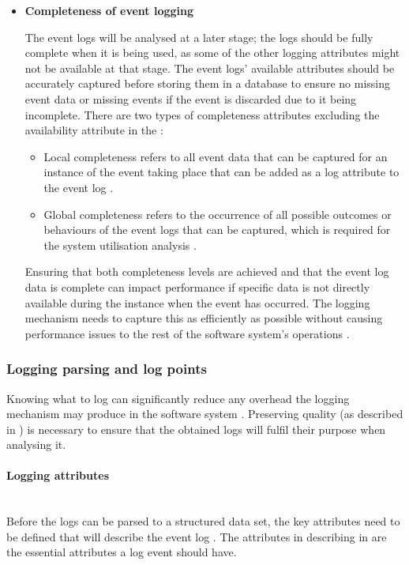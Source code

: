 \begin{itemize}
	\item \textbf{Completeness of event logging}\par The event logs will be analysed at a later stage; the logs should be fully complete when it is being used, as some of the other logging attributes might not be available at that stage. The event logs' available attributes should be accurately captured before storing them in a database to ensure no missing event data or missing events if the event is discarded due to it being incomplete. There are two types of completeness attributes excluding the availability attribute in the :

	\begin{itemize}
		\item Local completeness refers to all event data that can be captured for an instance of the event taking place that can be added as a log attribute to the event log \cite{Kherbouche2017, VanDerAalst2004}.
		\item Global completeness refers to the occurrence of all possible outcomes or behaviours of the event logs that can be captured, which is required for the system utilisation analysis \cite{Kherbouche2017, VanDerAalst2004}.
	\end{itemize}

	Ensuring that both completeness levels are achieved and that the event log data is complete can impact performance if specific data is not directly available during the instance when the event has occurred. The logging mechanism needs to capture this as efficiently as possible without causing performance issues to the rest of the software system's operations \cite{Zhu2015, Zhu2019}. 
\end{itemize}

\subsubsection{Logging parsing and log points}\label{sec:ch1_loggignPoints}
Knowing what to log can significantly reduce any overhead the logging mechanism may produce in the software system \cite{Jia2018, Pecchia2015}. Preserving quality (as described in ) is necessary to ensure that the obtained logs will fulfil their purpose when analysing it.

\paragraph{Logging attributes}\leavevmode\\
Before the logs can be parsed to a structured data set, the key attributes need to be defined that will describe the event log \cite{Bekeneva2020}. The attributes in describing in  are the essential attributes a log event should have. 

